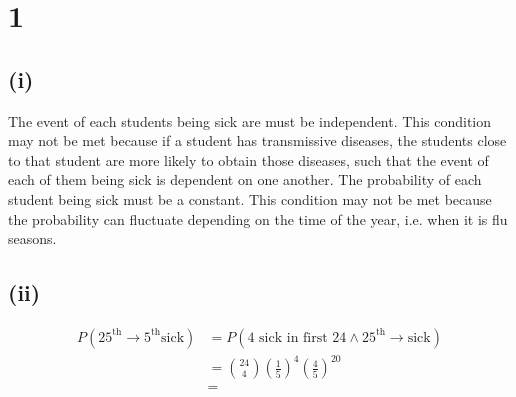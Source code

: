 \documentclass[a4paper]{article}
\begin{document}
\section*{1}
\subsection*{(i)}
The event of each students being sick are must be independent. This condition may not be met because if a student has transmissive diseases, the students close to that student are more likely to obtain those diseases, such that the event of each of them being sick is dependent on one another.
The probability of each student being sick must be a constant. This condition may not be met because the probability can fluctuate depending on the time of the year, i.e. when it is flu seasons.

\subsection*{(ii)}
\[\begin{aligned}
	P\left(25^\text{th}\to5^\text{th}\text{sick}\right)&=P\left(4\text{ sick in first }24\land25^\text{th}\to\text{sick}\right)\\
							    &=\genfrac(){0pt}0{24}4{\left(\frac15\right)}^4{\left(\frac45\right)}^{20}\\
							    &=\boxed{}
\end{aligned}\]
\end{document}

